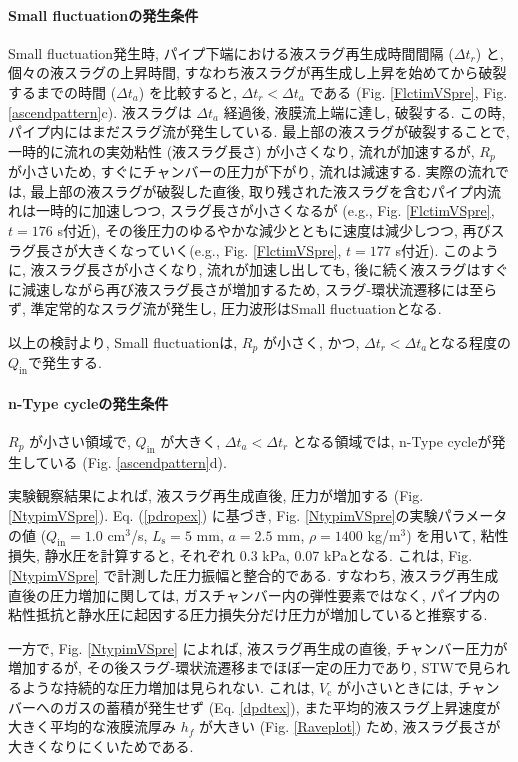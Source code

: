 \documentclass[aps,pre,preprint,groupedaddress,showkeys]{revtex4-2}
\begin{document}
\paragraph{Small fluctuationの発生条件}
Small fluctuation発生時, パイプ下端における液スラグ再生成時間間隔 ($\Delta t_r$) と, 個々の液スラグの上昇時間, すなわち液スラグが再生成し上昇を始めてから破裂するまでの時間 ($\Delta t_a$) を比較すると, $\Delta t_r<\Delta t_a$ である (Fig. \ref{FlctimVSpre}, Fig. \ref{ascendpattern}c). %
液スラグは $\Delta t_a$ 経過後, 液膜流上端に達し, 破裂する. この時, パイプ内にはまだスラグ流が発生している. 最上部の液スラグが破裂することで, 一時的に流れの実効粘性 (液スラグ長さ) が小さくなり, 流れが加速するが, $R_p$ が小さいため, すぐにチャンバーの圧力が下がり, 流れは減速する. 実際の流れでは, 最上部の液スラグが破裂した直後, 取り残された液スラグを含むパイプ内流れは一時的に加速しつつ, スラグ長さが小さくなるが (e.g., Fig. \ref{FlctimVSpre}, $t=176$ s付近), その後圧力のゆるやかな減少とともに速度は減少しつつ, 再びスラグ長さが大きくなっていく(e.g., Fig. \ref{FlctimVSpre}, $t=177$ s付近). 
このように, 液スラグ長さが小さくなり, 流れが加速し出しても, 後に続く液スラグはすぐに減速しながら再び液スラグ長さが増加するため, スラグ-環状流遷移には至らず, 準定常的なスラグ流が発生し, 圧力波形はSmall fluctuationとなる. 

以上の検討より, Small fluctuationは, $R_p$ が小さく, かつ, $\Delta t_r<\Delta t_a$となる程度の $Q_\mathrm{in}$で発生する. 


\paragraph{n-Type cycleの発生条件}
$R_p$ が小さい領域で, $Q_\mathrm{in}$ が大きく, $\Delta t_a < \Delta t_r$ となる領域では, n-Type cycleが発生している (Fig. \ref{ascendpattern}d). 

実験観察結果によれば, 液スラグ再生成直後, 圧力が増加する (Fig. \ref{NtypimVSpre}). Eq. (\ref{pdropex}) に基づき, Fig. \ref{NtypimVSpre}の実験パラメータの値 ($Q_\mathrm{in}=1.0$ cm$^3$/s, $L_\mathrm{s}= 5$ mm, $a=2.5$ mm, $\rho=1400$ kg/m$^3$) を用いて, 粘性損失, 静水圧を計算すると, それぞれ 0.3 kPa, 0.07 kPaとなる. これは, Fig. \ref{NtypimVSpre} で計測した圧力振幅と整合的である. すなわち, 液スラグ再生成直後の圧力増加に関しては, ガスチャンバー内の弾性要素ではなく, パイプ内の粘性抵抗と静水圧に起因する圧力損失分だけ圧力が増加していると推察する. 

一方で, Fig. \ref{NtypimVSpre} によれば, 液スラグ再生成の直後, チャンバー圧力が増加するが, その後スラグ-環状流遷移までほぼ一定の圧力であり, STWで見られるような持続的な圧力増加は見られない. 
これは, $V_\mathrm{c}$ が小さいときには, チャンバーへのガスの蓄積が発生せず (Eq. \ref{dpdtex}), また平均的液スラグ上昇速度が大きく平均的な液膜流厚み $h_f$ が大きい (Fig. \ref{Raveplot}) ため, 液スラグ長さが大きくなりにくいためである.
\end{document}
